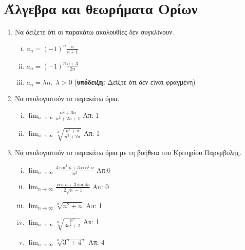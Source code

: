 \documentclass[a4paper,table]{report}
\begin{document}
\begin{center}
  \minibox[c]{\large \bfseries \textcolor{Col1}{Ακολουθίες}\\ \large 
  \textcolor{Col1}{Ασκήσεις}}
\end{center}

\vspace{\baselineskip}


\setcounter{chapter}{1}


\section{Άλγεβρα και θεωρήματα Ορίων}

\begin{enumerate}
  \item Να δείξετε ότι οι παρακάτω ακολουθίες δεν συγκλίνουν.
    \begin{enumerate}[i)]
      \item $ a_{n} = (-1)^{n} \frac{n}{n+1}  $
      \item $ a_{n} = (-1)^{n} \frac{n+3}{2n}  $
      \item $  a_{n} = \lambda n, \; \lambda >0$ 
        \hfill (\textbf{υπόδειξη:} Δείξτε ότι δεν είναι φραγμένη)
    \end{enumerate}

  \item Να υπολογιστούν τα παρακάτω όρια.
    \begin{enumerate}[i)]
      \item $ \lim_{n \to \infty} \frac{n^{2}+3n}{n^{2}+2n+1} $ \hfill Απ: 1 
      \item $ \lim_{n \to \infty} \sqrt[3]{\frac{n^{3}+n}{n^{3}+2n}} $ 
        \hfill Απ: 1 
    \end{enumerate}

  \item Να υπολογιστούν τα παρακάτω όρια με τη βοήθεια του Κριτηρίου 
    Παρεμβολής.

    \begin{enumerate}[i)]
      \item $ \lim_{n \to \infty} \frac{4 \sin^{3}{n} + 3 \cos^{2}{n}}{n^{2}} $ 
        \hfill Απ:0
      \item $ \lim_{n \to \infty} \frac{\cos{n} + 3 \sin{4n}}{ 2
        \sqrt{n} -1} $ \hfill Απ: 0  
      \item $ \lim_{n \to \infty} \sqrt[n]{n^{2}+n} $ \hfill Απ: 1 
      \item $ \lim_{n \to \infty} \sqrt[n]{\frac{n^{2}}{3n^{2}+2}} $ \hfill Απ: 1 
      \item $ \lim_{n \to \infty} \sqrt[n]{3^{n}+4^{n}} $ \hfill Απ: 4 
    \end{enumerate}


\end{enumerate}
\end{document}
